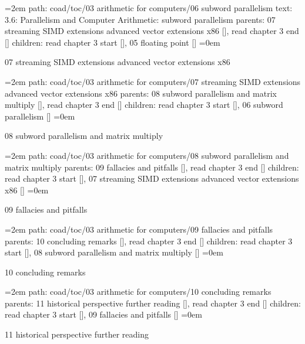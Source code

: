 \leftskip=2em
path: coad/toc/03 arithmetic for computers/06 subword parallelism
\smallskip
text:  3.6: Parallelism and Computer Arithmetic: subword parallelism
\smallskip
parents:  07 streaming SIMD extensions advanced vector extensions x86 [], read chapter 3 end []
\smallskip
children: read chapter 3 start [], 05 floating point []
\smallskip
\leftskip=0em
\par\endgroup
\bigskip
{}
07 streaming SIMD extensions advanced vector extensions x86
\smallskip
\par\begingroup
\leftskip=2em
path: coad/toc/03 arithmetic for computers/07 streaming SIMD extensions advanced vector extensions x86
\smallskip
parents:  08 subword parallelism and matrix multiply [], read chapter 3 end []
\smallskip
children: read chapter 3 start [], 06 subword parallelism []
\smallskip
\leftskip=0em
\par\endgroup
\bigskip
{}
08 subword parallelism and matrix multiply
\smallskip
\par\begingroup
\leftskip=2em
path: coad/toc/03 arithmetic for computers/08 subword parallelism and matrix multiply
\smallskip
parents:  09 fallacies and pitfalls [], read chapter 3 end []
\smallskip
children: read chapter 3 start [], 07 streaming SIMD extensions advanced vector extensions x86 []
\smallskip
\leftskip=0em
\par\endgroup
\bigskip
{}
09 fallacies and pitfalls
\smallskip
\par\begingroup
\leftskip=2em
path: coad/toc/03 arithmetic for computers/09 fallacies and pitfalls
\smallskip
parents:  10 concluding remarks [], read chapter 3 end []
\smallskip
children: read chapter 3 start [], 08 subword parallelism and matrix multiply []
\smallskip
\leftskip=0em
\par\endgroup
\bigskip
{}
10 concluding remarks
\smallskip
\par\begingroup
\leftskip=2em
path: coad/toc/03 arithmetic for computers/10 concluding remarks
\smallskip
parents:  11 historical perspective further reading [], read chapter 3 end []
\smallskip
children: read chapter 3 start [], 09 fallacies and pitfalls []
\smallskip
\leftskip=0em
\par\endgroup
\bigskip
{}
11 historical perspective further reading
\smallskip
\par\begingroup
